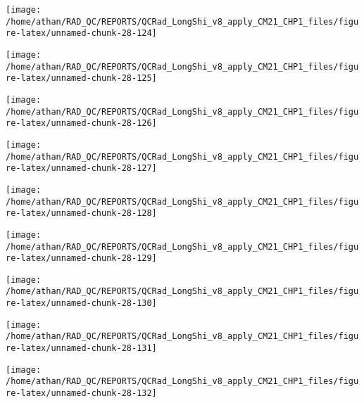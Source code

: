 \documentclass[
  10pt,
  a4paper,oneside]{article}
\begin{document}
\begin{center}\texttt{[image: /home/athan/RAD\_QC/REPORTS/QCRad\_LongShi\_v8\_apply\_CM21\_CHP1\_files/figure-latex/unnamed-chunk-28-124]} \end{center}

\begin{center}\texttt{[image: /home/athan/RAD\_QC/REPORTS/QCRad\_LongShi\_v8\_apply\_CM21\_CHP1\_files/figure-latex/unnamed-chunk-28-125]} \end{center}

\begin{center}\texttt{[image: /home/athan/RAD\_QC/REPORTS/QCRad\_LongShi\_v8\_apply\_CM21\_CHP1\_files/figure-latex/unnamed-chunk-28-126]} \end{center}

\begin{center}\texttt{[image: /home/athan/RAD\_QC/REPORTS/QCRad\_LongShi\_v8\_apply\_CM21\_CHP1\_files/figure-latex/unnamed-chunk-28-127]} \end{center}

\begin{center}\texttt{[image: /home/athan/RAD\_QC/REPORTS/QCRad\_LongShi\_v8\_apply\_CM21\_CHP1\_files/figure-latex/unnamed-chunk-28-128]} \end{center}

\begin{center}\texttt{[image: /home/athan/RAD\_QC/REPORTS/QCRad\_LongShi\_v8\_apply\_CM21\_CHP1\_files/figure-latex/unnamed-chunk-28-129]} \end{center}

\begin{center}\texttt{[image: /home/athan/RAD\_QC/REPORTS/QCRad\_LongShi\_v8\_apply\_CM21\_CHP1\_files/figure-latex/unnamed-chunk-28-130]} \end{center}

\begin{center}\texttt{[image: /home/athan/RAD\_QC/REPORTS/QCRad\_LongShi\_v8\_apply\_CM21\_CHP1\_files/figure-latex/unnamed-chunk-28-131]} \end{center}

\begin{center}\texttt{[image: /home/athan/RAD\_QC/REPORTS/QCRad\_LongShi\_v8\_apply\_CM21\_CHP1\_files/figure-latex/unnamed-chunk-28-132]} \end{center}
\end{document}
